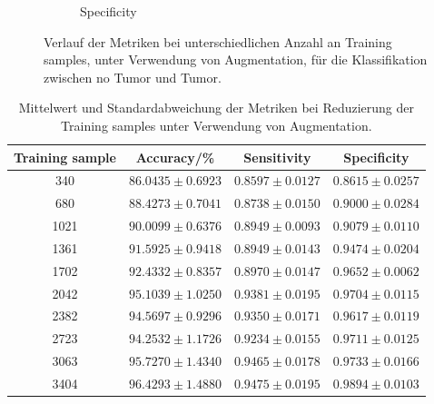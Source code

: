 \begin{figure}[H]
\begin{subfigure}[b]{0.48\textwidth}
    \caption{Specificity}
    \label{fig:augmentation_specificity}
  \end{subfigure}
  \caption{Verlauf der Metriken bei unterschiedlichen Anzahl an Training samples, unter Verwendung von Augmentation, für die Klassifikation zwischen no Tumor und Tumor.}
  \label{fig:augmentation_tu}
\end{figure}
\begin{table}[H]
    \centering
    {\small
        \begin{tabular}{cccc}
            \toprule
            Training sample & Accuracy/\% & Sensitivity & Specificity\\
            \midrule
            340  & $86.0435 \pm 0.6923$ & $0.8597 \pm 0.0127$ & $0.8615 \pm 0.0257$\\
            680  & $88.4273 \pm 0.7041$ & $0.8738 \pm 0.0150$ & $0.9000 \pm 0.0284$\\
            1021 & $90.0099 \pm 0.6376$ & $0.8949 \pm 0.0093$ & $0.9079 \pm 0.0110$\\
            1361 & $91.5925 \pm 0.9418$ & $0.8949 \pm 0.0143$ & $0.9474 \pm 0.0204$\\
            1702 & $92.4332 \pm 0.8357$ & $0.8970 \pm 0.0147$ & $0.9652 \pm 0.0062$\\
            2042 & $95.1039 \pm 1.0250$ & $0.9381 \pm 0.0195$ & $0.9704 \pm 0.0115$\\
            2382 & $94.5697 \pm 0.9296$ & $0.9350 \pm 0.0171$ & $0.9617 \pm 0.0119$\\
            2723 & $94.2532 \pm 1.1726$ & $0.9234 \pm 0.0155$ & $0.9711 \pm 0.0125$\\
            3063 & $95.7270 \pm 1.4340$ & $0.9465 \pm 0.0178$ & $0.9733 \pm 0.0166$\\
            3404 & $96.4293 \pm 1.4880$ & $0.9475 \pm 0.0195$ & $0.9894 \pm 0.0103$\\
            \bottomrule
        \end{tabular}}
  \caption{Mittelwert und Standardabweichung der Metriken bei Reduzierung der Training samples unter Verwendung von Augmentation.}
  \label{tab:augm-tunotu}
\end{table}

